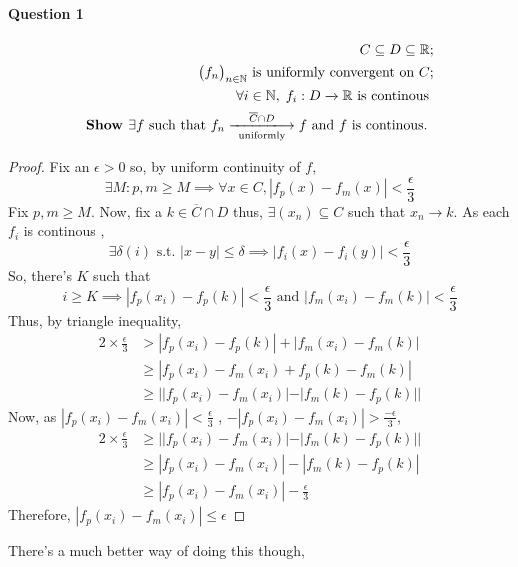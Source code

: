 \documentclass[20pt,a4paper]{extarticle} %
\begin{document}
\paragraph{Question 1}
\begin{eqnarray*}
	C \subseteq D \subseteq \mathbb{R};\\
	\big(f _n\big)_{n \in \mathbb{N}} \text{ is uniformly convergent on } C ;\\
	\forall i \in \mathbb{N} , \; f_i : D \xrightarrow{} \mathbb{R} \text{ is continous }\\
	\textbf{Show } \exists f \text{ such that } f_n \xlongrightarrow [ \text{ uniformly }]{ \overline{C} \cap D } f
	\text{ and } f \text{ is continous. }
\end{eqnarray*}
\begin{proof}
	Fix an $\epsilon > 0$ so, by uniform continuity of $f$,
	\[ \exists M: p,m \geq M \implies \forall x \in C, |f_p(x) - f_m(x)| < \frac{\epsilon}{3} \]
	Fix $p,m \geq M$.
	Now, fix a  $k \in \overline{C} \cap D$ thus, $\exists (x_n) \subseteq C$ such that $x_n \to k$.
	As each $f_i$ is continous ,
	\[ \exists \delta(i) \text{ s.t. } |x-y|\leq \delta \implies |f_i(x)-f_i(y)|<\frac{\epsilon}{3} \]
	So, there's $K$ such that
	\[ i\geq K \implies |f_p(x_i)-f_p(k)|< \frac{\epsilon}{3} \text{ and } |f_m(x_i)-f_m(k)|< \frac{\epsilon}{3} \]
	Thus, by triangle inequality,
	\begin{align*}
		2 \times \frac{\epsilon}{3} & > |f_p(x_i)-f_p(k)| + |f_m(x_i)-f_m(k)| \\
					    & \geq |f_p(x_i)-f_m(x_i)+f_p(k)-f_m(k)| \\
					    & \geq ||f_p(x_i)-f_m(x_i)|-|f_m(k)-f_p(k)||
	\end{align*}
	Now, as $|f_p(x_i)-f_m(x_i)|< \frac{\epsilon}{3}$ , $-|f_p(x_i)-f_m(x_i)|> \frac{-\epsilon}{3}$,
	\begin{align*}
		2 \times \frac{\epsilon}{3} & \geq ||f_p(x_i)-f_m(x_i)|-|f_m(k)-f_p(k)|| \\
					    & \geq |f_p(x_i)-f_m(x_i)|-|f_m(k)-f_p(k)|\\
					    & \geq |f_p(x_i)-f_m(x_i)|- \frac{\epsilon}{3}
	\end{align*}
	Therefore, $|f_p(x_i)-f_m(x_i)| \leq \epsilon$
\end{proof}
There's a much better way of doing this though,
\end{document}
